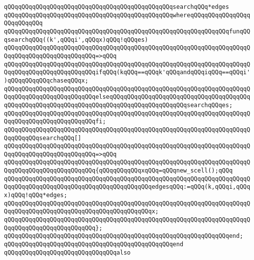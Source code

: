 \verb|qQQqqQQqqQQqqQQqqQQqqQQqqQQqqQQqqQQqqQQqqQQqqQQqsearchqQQq*edges|\newline
\verb|qQQqqQQqqQQqqQQqqQQqqQQqqQQqqQQqqQQqqQQqqQQqqQQqwhereqQQqqQQqqQQqqQQqqQQqqQQqqQQq|\newline
\verb|qQQqqQQqqQQqqQQqqQQqqQQqqQQqqQQqqQQqqQQqqQQqqQQqqQQqqQQqqQQqqQQqfunqQQqsearchqQQq((k',qQQqi',qQQqx)qQQq!qQQqes)|\newline
\verb|qQQqqQQqqQQqqQQqqQQqqQQqqQQqqQQqqQQqqQQqqQQqqQQqqQQqqQQqqQQqqQQqqQQqqQQqqQQqqQQqqQQqqQQqqQQqqQQq=>qQQq|\newline
\verb|qQQqqQQqqQQqqQQqqQQqqQQqqQQqqQQqqQQqqQQqqQQqqQQqqQQqqQQqqQQqqQQqqQQqqQQqqQQqqQQqqQQqqQQqqQQqqQQqifqQQq(kqQQq==qQQqk'qQQqandqQQqiqQQq==qQQqi')qQQqqQQqqQQqchaseqQQqx;|\newline
\verb|qQQqqQQqqQQqqQQqqQQqqQQqqQQqqQQqqQQqqQQqqQQqqQQqqQQqqQQqqQQqqQQqqQQqqQQqqQQqqQQqqQQqqQQqqQQqqQQqelseqQQqqQQqqQQqqQQqqQQqqQQqqQQqqQQqqQQqqQQqqQQqqQQqqQQqqQQqqQQqqQQqqQQqqQQqqQQqqQQqqQQqqQQqqQQqsearchqQQqes;|\newline
\verb|qQQqqQQqqQQqqQQqqQQqqQQqqQQqqQQqqQQqqQQqqQQqqQQqqQQqqQQqqQQqqQQqqQQqqQQqqQQqqQQqqQQqqQQqqQQqqQQqfi;|\newline
\newline
\verb|qQQqqQQqqQQqqQQqqQQqqQQqqQQqqQQqqQQqqQQqqQQqqQQqqQQqqQQqqQQqqQQqqQQqqQQqqQQqqQQqsearchqQQq[]|\newline
\verb|qQQqqQQqqQQqqQQqqQQqqQQqqQQqqQQqqQQqqQQqqQQqqQQqqQQqqQQqqQQqqQQqqQQqqQQqqQQqqQQqqQQqqQQqqQQqqQQq=>qQQq|\newline
\verb|qQQqqQQqqQQqqQQqqQQqqQQqqQQqqQQqqQQqqQQqqQQqqQQqqQQqqQQqqQQqqQQqqQQqqQQqqQQqqQQqqQQqqQQqqQQqqQQq{qQQqqQQqqQQqxqQQq=qQQqnew_scell();qQQq|\newline
\verb|qQQqqQQqqQQqqQQqqQQqqQQqqQQqqQQqqQQqqQQqqQQqqQQqqQQqqQQqqQQqqQQqqQQqqQQqqQQqqQQqqQQqqQQqqQQqqQQqqQQqqQQqqQQqqQQqedgesqQQq:=qQQq(k,qQQqi,qQQqx)qQQq!qQQq*edges;|\newline
\verb|qQQqqQQqqQQqqQQqqQQqqQQqqQQqqQQqqQQqqQQqqQQqqQQqqQQqqQQqqQQqqQQqqQQqqQQqqQQqqQQqqQQqqQQqqQQqqQQqqQQqqQQqqQQqqQQqx;|\newline
\verb|qQQqqQQqqQQqqQQqqQQqqQQqqQQqqQQqqQQqqQQqqQQqqQQqqQQqqQQqqQQqqQQqqQQqqQQqqQQqqQQqqQQqqQQqqQQqqQQq};|\newline
\verb|qQQqqQQqqQQqqQQqqQQqqQQqqQQqqQQqqQQqqQQqqQQqqQQqqQQqqQQqqQQqqQQqend;|\newline
\verb|qQQqqQQqqQQqqQQqqQQqqQQqqQQqqQQqqQQqqQQqqQQqqQQqend|\newline
\newline
\verb|qQQqqQQqqQQqqQQqqQQqqQQqqQQqqQQqalso|\newline
